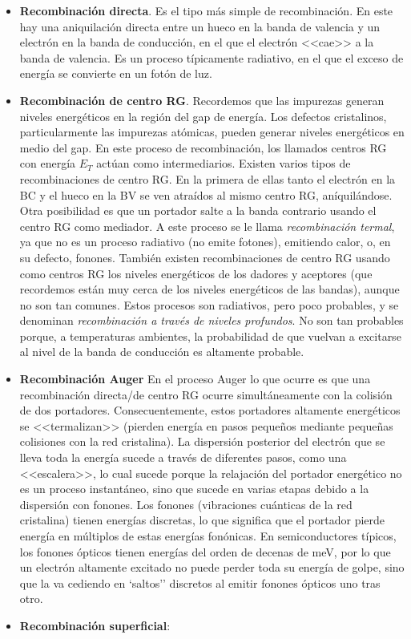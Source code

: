 \begin{itemize}
	\item \textbf{Recombinación directa}. Es el tipo más simple de recombinación. En este hay una aniquilación directa entre un hueco en la banda de valencia y un electrón en la banda de conducción, en el que el electrón <<cae>> a la banda de valencia. Es un proceso típicamente radiativo, en el que el exceso de energía se convierte en un fotón de luz.

	\item \textbf{Recombinación de centro RG}. Recordemos que las impurezas generan niveles energéticos en la región del gap de energía. Los defectos cristalinos, particularmente las impurezas atómicas, pueden generar niveles energéticos en medio del gap. En este proceso de recombinación, los llamados centros RG con energía $E_T$ actúan como intermediarios. Existen varios tipos de recombinaciones de centro RG. En la primera de ellas tanto el electrón en la BC y el hueco en la BV se ven atraídos al mismo centro RG, aníquilándose. Otra posibilidad es que un portador salte a la banda contrario usando el centro RG como mediador. A este proceso se le llama \textit{recombinación termal}, ya que no es un proceso radiativo (no emite fotones), emitiendo calor, o, en su defecto, fonones. También existen recombinaciones de centro RG usando como centros RG los niveles energéticos de los dadores y aceptores (que recordemos están muy cerca de los niveles energéticos de las bandas), aunque no son tan comunes. Estos procesos son radiativos, pero poco probables, y se denominan \textit{recombinación a través de niveles profundos}. No son tan probables porque, a temperaturas ambientes, la probabilidad de que vuelvan a excitarse al nivel de la banda de conducción es altamente probable.

	\item \textbf{Recombinación Auger} En el proceso Auger lo que ocurre es que una recombinación directa/de centro RG ocurre simultáneamente con la colisión de dos portadores. Consecuentemente, estos portadores altamente energéticos se <<termalizan>>  (pierden energía en pasos pequeños mediante pequeñas colisiones con la red cristalina). La dispersión posterior del electrón que se lleva toda la energía sucede a través de diferentes pasos, como una <<escalera>>, lo cual sucede  porque la relajación del portador energético no es un proceso instantáneo, sino que sucede en varias etapas debido a la dispersión con fonones. Los fonones (vibraciones cuánticas de la red cristalina) tienen energías discretas, lo que significa que el portador pierde energía en múltiplos de estas energías fonónicas. En semiconductores típicos, los fonones ópticos tienen energías del orden de decenas de meV, por lo que un electrón altamente excitado no puede perder toda su energía de golpe, sino que la va cediendo en `saltos'' discretos al emitir fonones ópticos uno tras otro.

	\item \textbf{Recombinación superficial}:
\end{itemize}

